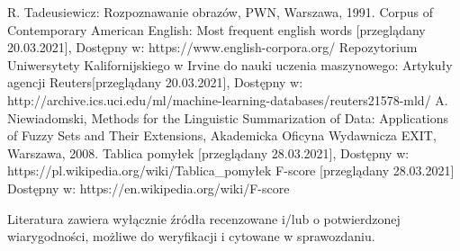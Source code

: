 \documentclass{classrep}
\begin{document}
\begin{thebibliography}{0}
 R. Tadeusiewicz: Rozpoznawanie obrazów, PWN, Warszawa, 1991.  
 Corpus of Contemporary American English: Most frequent english words [przeglądany  20.03.2021], Dostępny w: https://www.english-corpora.org/
 Repozytorium Uniwersytety Kalifornijskiego w Irvine do nauki uczenia maszynowego: Artykuły agencji Reuters[przeglądany 20.03.2021], 
Dostępny w: http://archive.ics.uci.edu/ml/machine-learning-databases/reuters21578-mld/
 A. Niewiadomski, Methods for the Linguistic Summarization of Data: Applications of Fuzzy Sets and Their Extensions, Akademicka Oficyna Wydawnicza EXIT, Warszawa, 2008.
 Tablica pomyłek [przeglądany 28.03.2021], Dostępny w: https://pl.wikipedia.org/wiki/Tablica\_pomyłek
 F-score [przeglądany 28.03.2021] Dostępny w: https://en.wikipedia.org/wiki/F-score
\end{thebibliography}

Literatura zawiera wyłącznie źródła recenzowane i/lub o potwierdzonej wiarygodności,
możliwe do weryfikacji i cytowane w sprawozdaniu. 
\end{document}

